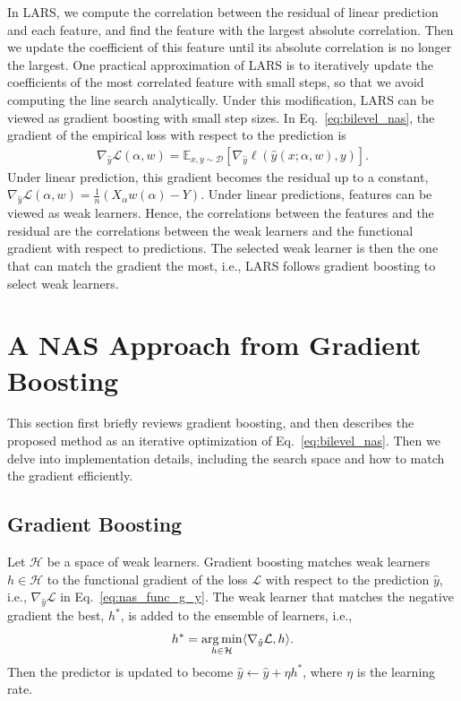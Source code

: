 In LARS, we compute the correlation between the residual of linear prediction and
each feature, and find the feature with the largest absolute correlation. Then we update the 
coefficient of this feature until its absolute correlation is no longer the largest.
One practical approximation of LARS is to iteratively update the coefficients of the most 
correlated feature with small steps, so that we avoid computing the line search analytically. 
Under this modification, LARS can be viewed as gradient boosting with small step sizes.
In Eq.~\ref{eq:bilevel_nas}, the gradient of the empirical loss with respect to the prediction is 
\begin{align}
\nabla _{\hat{y}} \mathcal{L} (\alpha, w) = \mathbb{E} _{x, y \sim \mathcal{D}} [ \nabla _{\hat{y}} \ell(\hat{y}(x ; \alpha, w), y) ].
\label{eq:nas_func_g_y}
\end{align}
Under linear prediction, this gradient becomes the residual up to a constant, 
$
\nabla _{\hat{y}} \mathcal{L} (\alpha, w) = \frac{1}{n}(X_{\alpha}w(\alpha) - Y).
$
Under linear predictions, features can be viewed as weak learners. 
Hence, the correlations between the features and the residual are
the correlations between the weak learners and the functional gradient with respect to predictions.
The selected weak learner is then the one that can match the gradient the most, i.e., 
LARS follows gradient boosting to select weak learners.






\section{A NAS Approach from Gradient Boosting}


This section first briefly reviews gradient boosting, and 
then describes the proposed method as an iterative optimization of Eq.~\ref{eq:bilevel_nas}. 
Then we delve into implementation details, including the search space and  
how to match the gradient efficiently.


\subsection{Gradient Boosting}
\label{sec:gb_review_nas}
Let $\mathcal{H}$ be a space of weak learners. 
Gradient boosting matches weak learners $h \in \mathcal{H}$ to 
the functional gradient of the loss $\mathcal{L}$ with respect to the prediction $\hat{y}$, 
i.e., $\nabla _{\hat{y}} \mathcal{L}$ in Eq.~\ref{eq:nas_func_g_y}.
The weak learner that matches the negative gradient the best, $h^*$, is added to the ensemble of learners, i.e.,
\begin{align}
h^* = \operatorname*{arg\,min} _{h \in \mathcal{H}} \langle \nabla _{\hat{y}} \mathcal{L}, h \rangle.
\end{align}
Then the predictor is updated to become $\hat{y} \leftarrow \hat{y} + \eta h^*$, where $\eta$ is the learning rate.

